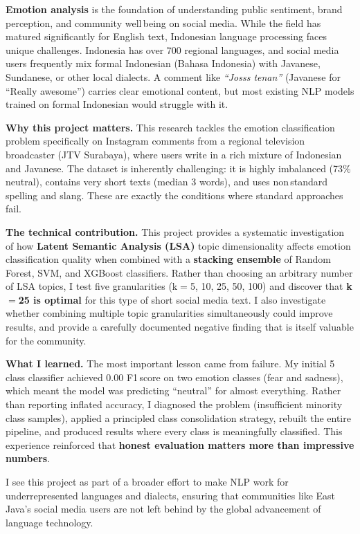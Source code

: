 \documentclass[12pt,a4paper,twoside]{article}
\theoremstyle{definition}
\begin{document}
\textbf{Emotion analysis} is the foundation of understanding public sentiment, brand perception, and community well\,being on social media. While the field has matured significantly for English text, Indonesian language processing faces unique challenges. Indonesia has over 700 regional languages, and social media users frequently mix formal Indonesian (Bahasa Indonesia) with Javanese, Sundanese, or other local dialects. A comment like \textit{``Josss tenan''} (Javanese for ``Really awesome'') carries clear emotional content, but most existing NLP models trained on formal Indonesian would struggle with it.

\textbf{Why this project matters.} This research tackles the emotion classification problem specifically on Instagram comments from a regional television broadcaster (JTV Surabaya), where users write in a rich mixture of Indonesian and Javanese. The dataset is inherently challenging: it is highly imbalanced (73\% neutral), contains very short texts (median 3 words), and uses non\,standard spelling and slang. These are exactly the conditions where standard approaches fail.

\textbf{The technical contribution.} This project provides a systematic investigation of how \textbf{Latent Semantic Analysis (LSA)} topic dimensionality affects emotion classification quality when combined with a \textbf{stacking ensemble} of Random Forest, SVM, and XGBoost classifiers. Rather than choosing an arbitrary number of LSA topics, I test five granularities (k$=$5, 10, 25, 50, 100) and discover that \textbf{k$=$25 is optimal} for this type of short social media text. I also investigate whether combining multiple topic granularities simultaneously could improve results, and provide a carefully documented negative finding that is itself valuable for the community.

\textbf{What I learned.} The most important lesson came from failure. My initial 5\,class classifier achieved 0.00 F1\,score on two emotion classes (fear and sadness), which meant the model was predicting ``neutral'' for almost everything. Rather than reporting inflated accuracy, I diagnosed the problem (insufficient minority class samples), applied a principled class consolidation strategy, rebuilt the entire pipeline, and produced results where every class is meaningfully classified. This experience reinforced that \textbf{honest evaluation matters more than impressive numbers}.

I see this project as part of a broader effort to make NLP work for underrepresented languages and dialects, ensuring that communities like East Java's social media users are not left behind by the global advancement of language technology.
\end{document}
